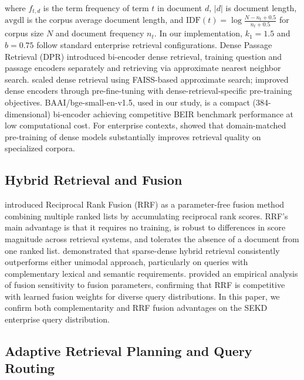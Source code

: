\documentclass[11pt, a4paper]{article}
\begin{document}
where $f_{t,d}$ is the term frequency of term $t$ in document $d$, $|d|$ is document length, $\text{avgdl}$ is the corpus average document length, and $\text{IDF}(t) = \log \frac{N - n_t + 0.5}{n_t + 0.5}$ for corpus size $N$ and document frequency $n_t$. In our implementation, $k_1{=}1.5$ and $b{=}0.75$ follow standard enterprise retrieval configurations. Dense Passage Retrieval (DPR) \citep{karpukhin2020dpr} introduced bi-encoder dense retrieval, training question and passage encoders separately and retrieving via approximate nearest neighbor search. \citet{xiong2020approximate} scaled dense retrieval using FAISS-based approximate search; \citet{gao2021condenser} improved dense encoders through pre-fine-tuning with dense-retrieval-specific pre-training objectives. BAAI/bge-small-en-v1.5, used in our study, is a compact (384-dimensional) bi-encoder achieving competitive BEIR benchmark performance \citep{thakur2021beir} at low computational cost. For enterprise contexts, \citet{oguz2021domain} showed that domain-matched pre-training of dense models substantially improves retrieval quality on specialized corpora.

\subsection{Hybrid Retrieval and Fusion}

\citet{cormack2009rrf} introduced Reciprocal Rank Fusion (RRF) as a parameter-free fusion method combining multiple ranked lists by accumulating reciprocal rank scores. RRF's main advantage is that it requires no training, is robust to differences in score magnitude across retrieval systems, and tolerates the absence of a document from one ranked list. \citet{luan2021sparse_dense} demonstrated that sparse-dense hybrid retrieval consistently outperforms either unimodal approach, particularly on queries with complementary lexical and semantic requirements. \citet{ma2022hybrid} provided an empirical analysis of fusion sensitivity to fusion parameters, confirming that RRF is competitive with learned fusion weights for diverse query distributions. In this paper, we confirm both complementarity and RRF fusion advantages on the SEKD enterprise query distribution.

\subsection{Adaptive Retrieval Planning and Query Routing}
\end{document}
